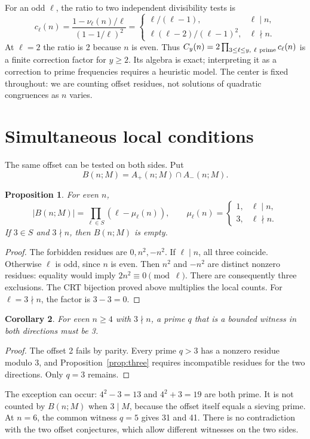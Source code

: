 \documentclass[11pt,a4paper]{article}
\newtheorem{proposition}{Proposition}
\newtheorem{corollary}[proposition]{Corollary}
\begin{document}
For an odd $\ell$, the ratio to two independent divisibility tests is
\[
c_\ell(n)=\frac{1-\nu_\ell(n)/\ell}{(1-1/\ell)^2}
=
\begin{cases}
\ell/(\ell-1),&\ell\mid n,\\
\ell(\ell-2)/(\ell-1)^2,&\ell\nmid n.
\end{cases}
\]
At $\ell=2$ the ratio is 2 because $n$ is even. Thus
$C_y(n)=2\prod_{3\le\ell\le y,\ \ell\ {\rm prime}}c_\ell(n)$ is a
finite correction factor for $y\ge2$. Its algebra is exact; interpreting it
as a correction to prime frequencies requires a heuristic model.
The center is fixed throughout: we are counting offset residues, not
solutions of quadratic congruences as $n$ varies.

\newpage
\section{Simultaneous local conditions}
The same offset can be tested on both sides. Put
\[
B(n;M)=A_+(n;M)\cap A_-(n;M).
\]

\begin{proposition}\label{prop:joint}
For even $n$,
\[
 |B(n;M)|=\prod_{\ell\in S}(\ell-\mu_\ell(n)),
 \qquad
 \mu_\ell(n)=
 \begin{cases}
 1,&\ell\mid n,\\
 3,&\ell\nmid n.
 \end{cases}
\]
If $3\in S$ and $3\nmid n$, then $B(n;M)$ is empty.
\end{proposition}
\begin{proof}
The forbidden residues are $0,n^2,-n^2$. If $\ell\mid n$, all three
coincide. Otherwise $\ell$ is odd, since $n$ is even. Then $n^2$ and
$-n^2$ are distinct nonzero residues: equality would imply
$2n^2\equiv0\pmod\ell$. There are consequently three exclusions.
The CRT bijection proved above multiplies the local counts.
For $\ell=3\nmid n$, the factor is $3-3=0$.
\end{proof}

\begin{corollary}\label{prop:common}
For even $n\ge4$ with $3\nmid n$, a prime $q$ that is a bounded witness
in both directions must be 3.
\end{corollary}
\begin{proof}
The offset 2 fails by parity. Every prime $q>3$ has a nonzero residue
modulo 3, and Proposition~\ref{prop:three} requires incompatible residues
for the two directions. Only $q=3$ remains.
\end{proof}
The exception can occur: $4^2-3=13$ and $4^2+3=19$ are both prime.
It is not counted by $B(n;M)$ when $3\mid M$, because the offset itself
equals a sieving prime. At $n=6$, the common witness $q=5$ gives 31 and 41.
There is no contradiction with the two offset conjectures, which allow
different witnesses on the two sides.
\end{document}
